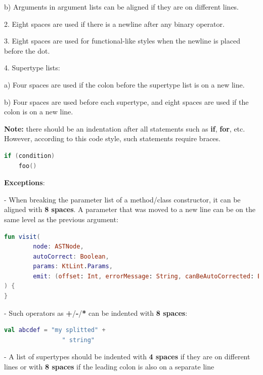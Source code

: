 {{{{{{{{{{{{{{{{b) Arguments in argument lists can be aligned if they are on different lines. 



2.	Eight spaces are used if there is a newline after any binary operator.



3.	Eight spaces are used for functional-like styles when the newline is placed before the dot.



4.	Supertype lists: \

a) Four spaces are used if the colon before the supertype list is on a new line. \

b) Four spaces are used before each supertype, and eight spaces are used if the colon is on a new line. 



\textbf{Note:} there should be an indentation after all statements such as \textbf{if}, \textbf{for}, etc. However, according to this code style, such statements require braces. 



\begin{lstlisting}[language=Kotlin]
if (condition)
    foo()
\end{lstlisting}


\textbf{Exceptions}: 

- When breaking the parameter list of a method/class constructor, it can be aligned with \textbf{8 spaces}. A parameter that was moved to a new line can be on the same level as the previous argument:

    

\begin{lstlisting}[language=Kotlin]
fun visit(
        node: ASTNode,
        autoCorrect: Boolean,
        params: KtLint.Params,
        emit: (offset: Int, errorMessage: String, canBeAutoCorrected: Boolean) -> Unit
) {   
}
\end{lstlisting}
    

- Such operators as \textbf{+}/\textbf{-}/\textbf{*} can be indented with \textbf{8 spaces}:

    

\begin{lstlisting}[language=Kotlin]
val abcdef = "my splitted" +
                " string"
\end{lstlisting}
    

- A list of supertypes should be indented with \textbf{4 spaces} if they are on different lines or with \textbf{8 spaces} if the leading colon is also on a separate line



}}}}}}}}}}}}}}}}

